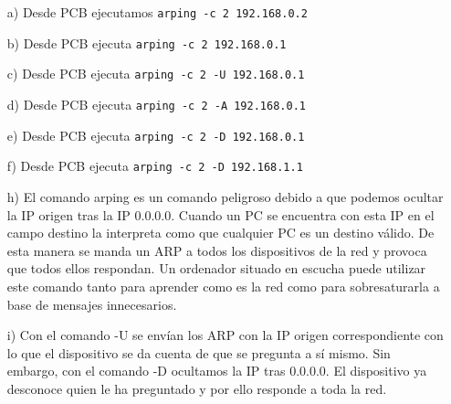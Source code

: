 \documentclass[a4paper,12pt,twoside]{article}
\begin{document}
\begin{itemize}
\item[a)]Desde PCB ejecutamos {\tt arping -c 2 192.168.0.2}
\item[b)]Desde PCB ejecuta {\tt arping -c 2 192.168.0.1}
\item[c)]Desde PCB ejecuta {\tt arping -c 2 -U 192.168.0.1}
\item[d)]Desde PCB ejecuta {\tt arping -c 2 -A 192.168.0.1}
\item[e)]Desde PCB ejecuta {\tt arping -c 2 -D 192.168.0.1}
\item[f)]Desde PCB ejecuta {\tt arping -c 2 -D 192.168.1.1}
\item[h)] El comando arping es un comando peligroso debido a que podemos ocultar la IP origen tras la IP 0.0.0.0. Cuando un PC se encuentra con esta IP en el campo destino la interpreta como que cualquier PC es un destino válido. De esta manera se manda un ARP a todos los dispositivos de la red y provoca que todos ellos respondan. Un ordenador situado en escucha puede utilizar este comando tanto para aprender como es la red como para sobresaturarla a base de mensajes innecesarios.
\item[i)] Con el comando -U se envían los ARP con la IP origen correspondiente con lo que el dispositivo se da cuenta de que se pregunta a sí mismo. Sin embargo, con el comando -D ocultamos la IP tras 0.0.0.0. El dispositivo ya desconoce quien le ha preguntado y por ello responde a toda la red.
\end{itemize}
\end{document}
